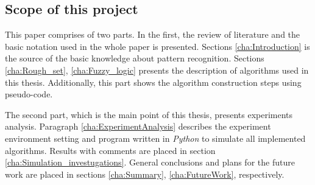 \subsection{Scope of this project} 
This paper comprises of two parts. In the first, the review of
literature and the basic notation used in the whole paper is presented. Sections
\ref{cha:Introduction} is the source of the basic
knowledge about pattern recognition. Sections \ref{cha:Rough_set}, \ref{cha:Fuzzy_logic}
presents the description of algorithms used in this thesis. Additionally, this
part shows the algorithm construction steps using pseudo-code.

The second part, which is the main point of this thesis, presents experiments analysis.
Paragraph \ref{cha:ExperimentAnalysis} describes the experiment environment
setting and program written in \textit{Python} to simulate all implemented
algorithms.  Results with comments are placed in
section \ref{cha:Simulation_investugations}. General
conclusions and plans for the future work are placed in sections
\ref{cha:Summary}, \ref{cha:FutureWork}, respectively. 

